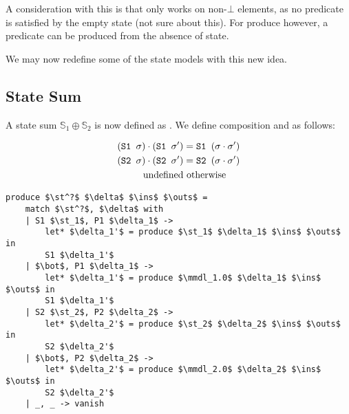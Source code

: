 A consideration with this is that  only works on non-$\bot$ elements, as no predicate is satisfied by the empty state (not sure about this). For produce however, a predicate can be produced from the absence of state.

We may now redefine some of the state models with this new idea.

\subsection{State Sum}

A state sum $\mathbb S_1 \oplus \mathbb S_2$ is now defined as . We define composition and  as follows:

\begin{align*}
	(\texttt{S1 }\sigma)\cdot(\texttt{S1 }\sigma') &= \texttt{S1 }(\sigma\cdot\sigma')\\
	(\texttt{S2 }\sigma)\cdot(\texttt{S2 }\sigma') &= \texttt{S2 }(\sigma\cdot\sigma')\\
	\text{undefined}&\text{ otherwise}
\end{align*}

\begin{lstlisting}
produce $\st^?$ $\delta$ $\ins$ $\outs$ =
	match $\st^?$, $\delta$ with
	| S1 $\st_1$, P1 $\delta_1$ ->
		let* $\delta_1'$ = produce $\st_1$ $\delta_1$ $\ins$ $\outs$ in
		S1 $\delta_1'$
	| $\bot$, P1 $\delta_1$ ->
		let* $\delta_1'$ = produce $\mmdl_1.0$ $\delta_1$ $\ins$ $\outs$ in
		S1 $\delta_1'$
	| S2 $\st_2$, P2 $\delta_2$ ->
		let* $\delta_2'$ = produce $\st_2$ $\delta_2$ $\ins$ $\outs$ in
		S2 $\delta_2'$
	| $\bot$, P2 $\delta_2$ ->
		let* $\delta_2'$ = produce $\mmdl_2.0$ $\delta_2$ $\ins$ $\outs$ in
		S2 $\delta_2'$
	| _, _ -> vanish
\end{lstlisting}
